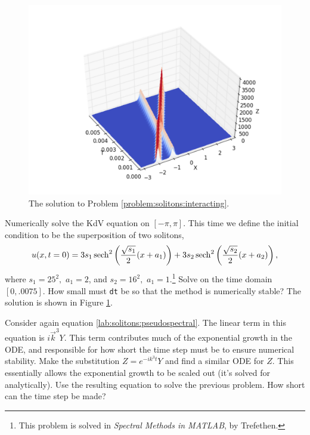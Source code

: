 \begin{figure}
\centering
\includegraphics[width=\textwidth]{interacting_solitons.pdf}
\caption{The solution to Problem \ref{problem:solitons:interacting}.}
\label{fig:solitons:interacting}
\end{figure}


\begin{problem}
Numerically solve the KdV equation on $[-\pi,\pi]$. This time we define the initial condition 
to be the superposition of two solitons,
\[
u(x,t=0) = 3s_1\operatorname{sech}^2\left(\frac{\sqrt{s_1}}{2}(x+a_1)\right) + 3s_2\operatorname{sech}^2\left(\frac{\sqrt{s_2}}{2}(x+a_2)\right),
\]
where $s_1 = 25^2,$ $a_1 = 2$, and $s_2 = 16^2,$ $a_1 = 1$.\footnote{This problem is solved in \textit{Spectral Methods in MATLAB}, by Trefethen.} Solve on the time domain $[0,.0075]$.  How small must {\tt dt} be so that the method is numerically stable?  The solution is shown in Figure \ref{fig:solitons:interacting}.
\label{problem:solitons:interacting}
\end{problem}







\begin{problem}
	Consider again equation \eqref{lab:solitons:pseudospectral}. The linear term in this equation is 
	$i\vec{k}^3Y$. This term contributes much of the exponential growth in the ODE, and responsible for 
	how short the time step must be to ensure numerical stability. Make the substitution $Z = e^{-ik^3t}Y$ and find a similar ODE for $Z$. This essentially allows the exponential growth to be scaled out (it's solved for analytically). Use the resulting equation to solve the previous problem. How short can the time step be made? 
\end{problem}











